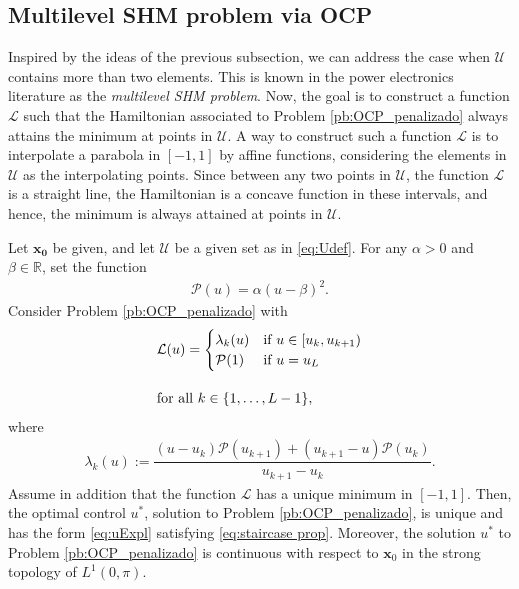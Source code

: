 \documentclass[9pt,shortpaper,twoside,web]{ieeecolor}
\begin{document}
\subsection{Multilevel SHM problem via OCP}

Inspired by the ideas of the previous subsection, we can address the case when $\mathcal{U}$ contains more than two elements. This is known in the power electronics literature as the \textit{multilevel SHM problem}. Now, the goal is to construct a function $\mathcal{L}$ such that the Hamiltonian associated to Problem \ref{pb:OCP_penalizado} always attains the minimum at points in $\mathcal{U}$. A way to construct such a function $\mathcal{L}$ is to interpolate a parabola in $[-1,1]$ by affine functions, considering the elements in $\mathcal{U}$ as the interpolating points.  Since between any two points in $\mathcal{U}$,  the function $\mathcal{L}$ is a straight line,  the Hamiltonian is a concave function in these intervals, and hence, the minimum is always attained at points in $\mathcal{U}$.

\begin{theorem}\label{th:PLP}
	Let $\bm{x_0}$ be given, and let $\mathcal{U}$ be a given set as in \eqref{eq:Udef}. For any $\alpha>0$ and $\beta\in \mathbb{R}$, set the function
	\begin{align}\label{eq:parabola}
		\mathcal{P}(u) = \alpha (u-\beta)^2.
	\end{align}
	Consider Problem \ref{pb:OCP_penalizado} with 
	\begin{align}\label{eq:PLP}
		&\mathcal{L}(u) = \begin{cases}
			\lambda_k(u) & \text{if }  u \in [u_k,u_{k+1}) \\ \mathcal{P}(1) & \text{if } u = u_{L} 
		\end{cases} 
		\\[10pt]
		&\notag \text{for all } k \in \{1,\dots,L-1\}, 
	\end{align}
	where 
	\begin{align}\label{eq:lambda k}
		\lambda_k(u):= \dfrac{ (u-u_k)\mathcal{P}(u_{k+1}) + (u_{k+1}- u) \mathcal{P}(u_k)}{u_{k+1} - u_k}.
	\end{align}
	Assume in addition that the function $\mathcal{L}$ has a unique minimum in $[-1,1]$. Then, the optimal control $u^\ast$, solution to Problem \ref{pb:OCP_penalizado}, is unique and has the form \eqref{eq:uExpl} satisfying \eqref{eq:staircase prop}. Moreover, the solution $u^\ast$ to Problem \ref{pb:OCP_penalizado} is continuous with respect to $\bm{x}_0$ in the strong topology of $L^1(0,\pi)$.
\end{theorem}
\end{document}
